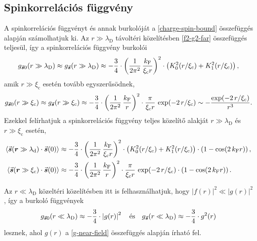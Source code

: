\documentclass[a4paper,12pt,titlepage]{article}
\newcommand{\RR}{{\vb*{r}}}
\newcommand{\kF}{{k_\text{F}}}
\newcommand{\xic}{{\xi_\text{c}}}
\begin{document}
\subsection{Spinkorrelációs függvény}

A spinkorrelációs függvényt és annak burkolóját a \eqref{charge-spin-bound} összefüggés alapján számolhatjuk ki.  Az $r \gg \lambda_\text{D}$ távoltéri közelítésben \eqref{f2-g2-far} összefüggés teljesül, így a spinkorrelációs függvény burkolói
\begin{equation}
	g_{\va*{s} 0}(r \gg \lambda_\text{D}) \approx g_{\va*{s}}(r \gg \lambda_\text{D}) \approx -\frac{3}{4} \cdot \left( \frac{1}{2 \pi^2} \, \frac{\kF}{\xic r} \right)^2 \cdot \left( K_0^2(r / \xic) + K_1^2(r / \xic) \right),
\end{equation}
amik $r \gg \xic$ esetén tovább egyszerűsödnek,
\begin{equation}
	g_{\va*{s} 0}(r \gg \xic) \approx g_{\va*{s}}(r \gg \xic) \approx -\frac{3}{4} \cdot \left( \frac{1}{2 \pi^2} \, \frac{\kF}{r} \right)^2 \cdot \frac{\pi}{\xic r} \, \exp(-2 \, r / \xic) \sim -\frac{\exp(-2 \, r / \xic)}{r^3}.
\end{equation}
Ezekkel felírhatjuk a spinkorrelációs függvény teljes közelítő alakját $r \gg \lambda_\text{D}$ és $r \gg \xic$ esetén,
\begin{equation}
\begin{split}
	\expval{\va*{s}(\RR \gg \lambda_\text{d}) \cdot \va*{s}(0)} & \approx -\frac{3}{4} \cdot \left( \frac{1}{2 \pi^2} \, \frac{\kF}{\xic r} \right)^2 \cdot \left( K_0^2(r / \xic) + K_1^2(r / \xic) \right) \cdot \left( 1 - \cos(2 \, \kF r) \right), \\
	\expval{\va*{s}(\RR \gg \xic) \cdot \va*{s}(0)} & \approx -\frac{3}{4} \cdot \left( \frac{1}{2 \pi^2} \, \frac{\kF}{r} \right)^2 \cdot \frac{\pi}{\xic r} \, \exp(-2 \, r / \xic) \cdot \left( 1 - \cos(2 \, \kF r) \right).
\end{split}
\end{equation}

Az $r \ll \lambda_\text{D}$ közeltéri közelítésben itt is felhasználhatjuk, hogy $\left| f(r) \right|^2 \ll \left| g(r) \right|^2$, így a burkoló függvények
\begin{equation}
	g_{\va*{s} 0}(r \ll \lambda_\text{D}) \approx -\frac{3}{4} \cdot \left| g(r) \right|^2 ~~~ \text{és} ~~~ g_{\va*{s}}(r \ll \lambda_\text{D}) \approx -\frac{3}{4} \cdot g^2(r)
\end{equation}
lesznek, ahol $g(r)$ a \eqref{g-near-field} összefüggés alapján írható fel.
\end{document}
